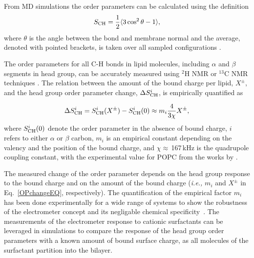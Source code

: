 From MD simulations the order parameters can be calculated using the definition
\begin{equation}\label{OP} 
S_{\rm CH}=\frac{1}{2}\langle 3\cos^2\theta -1 \rangle, 
\end{equation} 
where $\theta$ is the angle between the bond and membrane
normal and the average, denoted with pointed brackets, is taken over all sampled configurations \citep{ollila16}.

The order parameters for all C-H bonds in lipid molecules, including
$\alpha$ and $\beta$ segments in head group, can be accurately measured
using $^2$H NMR or $^{13}$C NMR techniques \citep{ollila16}. 
The relation between the amount of the bound charge per lipid,  $X^\pm$, and
the head group order parameter change, $\Delta S_{\rm{CH}}^{i}$,
is empirically quantified as~\citep{seelig87,ferreira16}

\begin{equation}\label{OPchangeEQ} 
\Delta S_{\rm{CH}}^{i}= S_{\rm{CH}}^{i}(X^\pm)-S_{\rm{CH}}^{i}(0) \approx m_i \frac{4 }{3\chi}X^\pm, 
\end{equation} 
where $S_{\rm{CH}}^{i}(0)$ denote the order parameter in the absence of bound charge,
$i$ refers to either $\alpha$ or $\beta$ carbon,
$m_i$ is an empirical constant depending on the valency and the position of the bound charge,
and $\chi \approx$\,167\,kHz is the quadrupole coupling constant, 
with the experimental value for POPC from the works by \citet{seelig77,Davis83}.

The measured change of the order parameter depends on the head group response to the bound charge 
and on the amount of the bound charge (\textit{i.e.,} $m_i$ and $X^\pm$ in Eq.~\ref{OPchangeEQ}, respectively).  
The quantification of the empirical factor $m_i$ has been done experimentally for a wide range of systems
to show the robustness of the electrometer concept and its negligable chemical specificity~\citep{seelig87, beschiasvili91}. 
The measurements of the electrometer response to cationic surfactants 
can be leveraged in simulations to compare the response of the head group order parameters 
with a known amount of bound surface charge,
as all molecules of the surfactant partition into the bilayer. 


